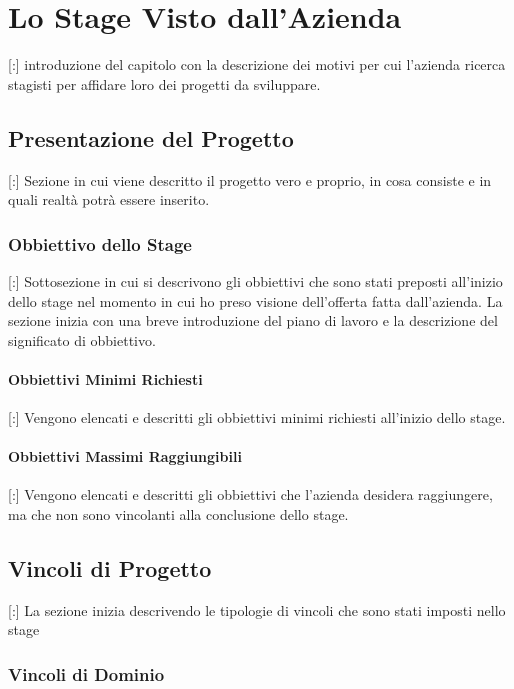 \documentclass[11pt]{book}              %
\begin{document}
\newpage
\chapter{Lo Stage Visto dall'Azienda}
\thispagestyle{fancy} 
[:] introduzione del capitolo con la descrizione dei motivi per cui l'azienda ricerca stagisti per affidare loro dei progetti da sviluppare.

\section{Presentazione del Progetto}

[:] Sezione in cui viene descritto il progetto vero e proprio, in cosa consiste e in quali realtà potrà essere inserito.

\subsection{Obbiettivo dello Stage}

[:] Sottosezione in cui si descrivono gli obbiettivi che sono stati preposti all'inizio dello stage nel momento in cui ho preso visione dell'offerta fatta dall'azienda.
La sezione inizia con una breve introduzione del piano di lavoro e la descrizione del significato di obbiettivo.

\subsubsection{Obbiettivi Minimi Richiesti}

[:] Vengono elencati e descritti gli obbiettivi minimi richiesti all'inizio dello stage.

\subsubsection{Obbiettivi Massimi Raggiungibili}

[:] Vengono elencati e descritti gli obbiettivi che l'azienda desidera raggiungere, ma che non sono vincolanti alla conclusione dello stage.

\section{Vincoli di Progetto}

[:] La sezione inizia descrivendo le tipologie di vincoli che sono stati imposti nello stage

\subsection{Vincoli di Dominio}
\end{document}
